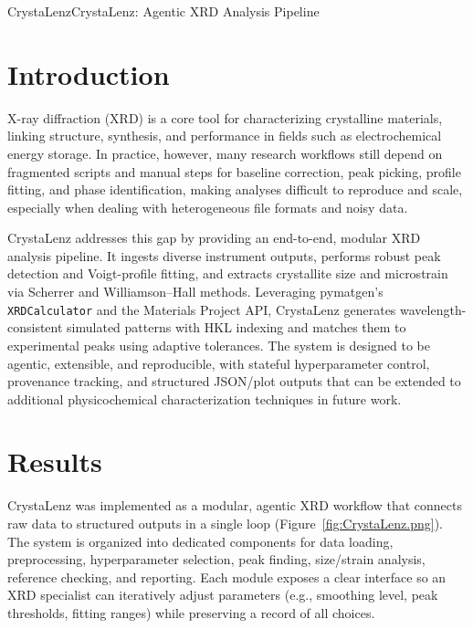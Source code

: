 
\begin{teamsubmission}{CrystaLenz}{CrystaLenz: Agentic XRD Analysis Pipeline}



\section*{Introduction}
X-ray diffraction (XRD) is a core tool for characterizing crystalline materials, linking structure, synthesis, and performance in fields such as electrochemical energy storage.\cite{acsaem5c00530} In practice, however, many research workflows still depend on fragmented scripts and manual steps for baseline correction, peak picking, profile fitting, and phase identification, making analyses difficult to reproduce and scale, especially when dealing with heterogeneous file formats and noisy data.

CrystaLenz addresses this gap by providing an end-to-end, modular XRD analysis pipeline. It ingests diverse instrument outputs, performs robust peak detection and Voigt-profile fitting, and extracts crystallite size and microstrain via Scherrer and Williamson–Hall methods. Leveraging pymatgen’s \texttt{XRDCalculator} and the Materials Project API, CrystaLenz generates wavelength-consistent simulated patterns with HKL indexing and matches them to experimental peaks using adaptive tolerances. The system is designed to be agentic, extensible, and reproducible, with stateful hyperparameter control, provenance tracking, and structured JSON/plot outputs that can be extended to additional physicochemical characterization techniques in future work.

\section*{Results}
CrystaLenz was implemented as a modular, agentic XRD workflow that connects raw data to structured outputs in a single loop (Figure~\ref{fig:CrystaLenz.png}). The system is organized into dedicated components for data loading, preprocessing, hyperparameter selection, peak finding, size/strain analysis, reference checking, and reporting. Each module exposes a clear interface so an XRD specialist can iteratively adjust parameters (e.g., smoothing level, peak thresholds, fitting ranges) while preserving a record of all choices.


\end{teamsubmission}

